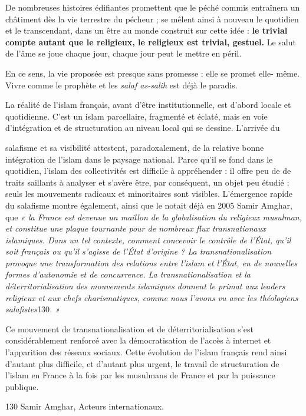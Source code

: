 De nombreuses histoires édifiantes promettent que le péché commis
entraînera un châtiment dès la vie terrestre du pécheur ; se mêlent
ainsi à nouveau le quotidien et le transcendant, dans un être au monde
construit sur cette idée : \textbf{le trivial compte autant que le
religieux, le religieux est trivial, gestuel.} Le salut de l'âme se joue
chaque jour, chaque jour peut le mettre en péril.

En ce sens, la vie proposée est presque sans promesse : elle se promet
elle- même. Vivre comme le prophète et les \emph{salaf as-salih} est
déjà le paradis.

La réalité de l'islam français, avant d'être institutionnelle, est
d'abord locale et quotidienne. C'est un islam parcellaire, fragmenté et
éclaté, mais en voie d'intégration et de structuration au niveau local
qui se dessine. L'arrivée du



salafisme et sa visibilité attestent, paradoxalement, de la relative
bonne intégration de l'islam dans le paysage national. Parce qu'il se
fond dans le quotidien, l'islam des collectivités est difficile à
appréhender : il offre peu de de traits saillants à analyser et s'avère
être, par conséquent, un objet peu étudié ; seuls les mouvements
radicaux et minoritaires sont visibles. L'émergence rapide du salafisme
montre également, ainsi que le notait déjà en 2005 Samir Amghar, que
\emph{« la France est devenue un maillon de la globalisation du
religieux musulman, et constitue une plaque tournante pour de nombreux
flux transnationaux islamiques. Dans un tel contexte, comment concevoir
le contrôle de l'État, qu'il soit français ou qu'il s'agisse de l'État
d'origine ? La transnationalisation provoque une transformation des
relations entre l'islam et l'État, en de nouvelles formes d'autonomie et
de concurrence. La transnationalisation et la déterritorialisation des
mouvements islamiques donnent le primat aux leaders religieux et aux
chefs charismatiques, comme nous l'avons vu avec les théologiens
salafistes}130\emph{. »}

Ce mouvement de transnationalisation et de déterritorialisation s'est
considérablement renforcé avec la démocratisation de l'accès à internet
et l'apparition des réseaux sociaux. Cette évolution de l'islam français
rend ainsi d'autant plus difficile, et d'autant plus urgent, le travail
de structuration de l'islam en France à la fois par les musulmans de
France et par la puissance publique.

130 Samir Amghar, Acteurs internationaux.


